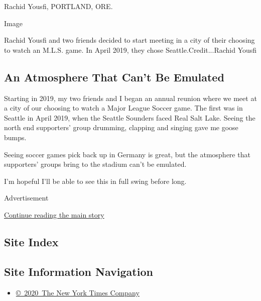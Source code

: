 Rachid Yousfi, PORTLAND, ORE.

Image

Rachid Yousfi and two friends decided to start meeting in a city of
their choosing to watch an M.L.S. game. In April 2019, they chose
Seattle.Credit...Rachid Yousfi

\hypertarget{an-atmosphere-that-cant-be-emulated}{%
\subsection{An Atmosphere That Can't Be
Emulated}\label{an-atmosphere-that-cant-be-emulated}}

Starting in 2019, my two friends and I began an annual reunion where we
meet at a city of our choosing to watch a Major League Soccer game. The
first was in Seattle in April 2019, when the Seattle Sounders faced Real
Salt Lake. Seeing the north end supporters' group drumming, clapping and
singing gave me goose bumps.

Seeing soccer games pick back up in Germany is great, but the atmosphere
that supporters' groups bring to the stadium can't be emulated.

I'm hopeful I'll be able to see this in full swing before long.

Advertisement

\protect\hyperlink{after-bottom}{Continue reading the main story}

\hypertarget{site-index}{%
\subsection{Site Index}\label{site-index}}

\hypertarget{site-information-navigation}{%
\subsection{Site Information
Navigation}\label{site-information-navigation}}

\begin{itemize}
\tightlist
\item
  \href{https://help.nytimes3xbfgragh.onion/hc/en-us/articles/115014792127-Copyright-notice}{©~2020~The
  New York Times Company}
\end{itemize}


